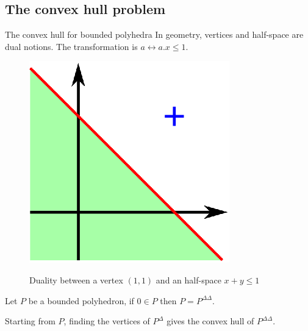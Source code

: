 \subsection{The convex hull problem}
\begin{frame}{The convex hull for bounded polyhedra}
In geometry, vertices and half-space are dual notions. The transformation is $a \leftrightarrow a.x \leq 1 $.
\begin{figure}
\includegraphics[scale=0.7]{images/dual.eps}

Duality between a vertex $(1,1)$ and an half-space $x+y \leq 1$
\end{figure}

\vspace*{-0.5cm}

\begin{theorem}
Let $P$ be a bounded polyhedron, if $0\in P$ then $P=P^{\Delta\Delta}$.
\end{theorem}

Starting from $P$, finding the vertices of $P^\Delta$ gives the convex hull of $P^{\Delta\Delta}$.
\end{frame}

